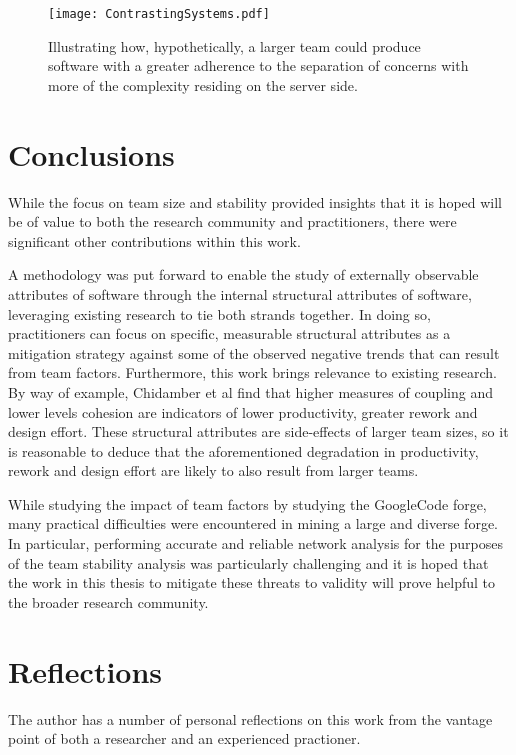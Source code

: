 \begin{itemize}
\end{itemize}

\begin{figure}[htbp!] 
\centering
\texttt{[image: ContrastingSystems.pdf]}
\caption{Illustrating how, hypothetically, a larger team could produce software with a greater adherence to the separation of concerns with more of the complexity residing on the server side.}
\label{fig:ContrastingSystems}
\end{figure}

\section{Conclusions} %
While the focus on team size and stability provided insights that it is hoped will be of value to both the research community and practitioners, there were significant other contributions within this work. 

A methodology was put forward to enable the study of externally observable attributes of software through the internal structural attributes of software, leveraging existing research to tie both strands together. In doing so, practitioners can focus on specific, measurable structural attributes as a mitigation strategy against some of the observed negative trends that can result from team factors. Furthermore, this work brings relevance to existing research. By way of example, Chidamber et al \citep{chidamber1998managerial} find that higher measures of coupling and lower levels cohesion are indicators of lower productivity, greater rework and design effort. These structural attributes are side-effects of larger team sizes, so it is reasonable to deduce that the aforementioned degradation in productivity, rework and design effort are likely to also result from larger teams.

While studying the impact of team factors by studying the GoogleCode forge, many practical difficulties were encountered in mining a large and diverse forge. In particular, performing accurate and reliable network analysis for the purposes of the team stability analysis was particularly challenging and it is hoped that the work in this thesis to mitigate these threats to validity will prove helpful to the broader research community. 

\section{Reflections} %
The author has a number of personal reflections on this work from the vantage point of both a researcher and an experienced practioner.

